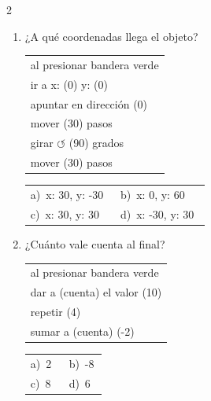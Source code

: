 \documentclass[11pt,a4paper]{article}
\begin{document}
\begin{multicols}{2}
\begin{enumerate}[label=\textbf{\arabic*.},leftmargin=*,itemsep=10pt,topsep=0pt]
\item \begin{minipage}[t]{\linewidth}
¿A qué coordenadas llega el objeto?
\par\vspace{3pt}\hspace*{1em}\begin{tabular}{@{}l@{}}\ttfamily\small al presionar bandera verde \\
\ttfamily\small ir a x: (0) y: (0) \\
\ttfamily\small apuntar en dirección (0) \\
\ttfamily\small mover (30) pasos \\
\ttfamily\small girar $\circlearrowleft$ (90) grados \\
\ttfamily\small mover (30) pasos
\end{tabular}\par

\vspace{4pt}
\begin{tabular}{@{}>{\raggedright\arraybackslash}p{0.47\linewidth}>{\raggedright\arraybackslash}p{0.47\linewidth}@{}}
a)~x: 30, y: -30 & b)~x: 0, y: 60 \\
c)~x: 30, y: 30 & d)~x: -30, y: 30 \\
\end{tabular}
\end{minipage}

\item \begin{minipage}[t]{\linewidth}
¿Cuánto vale cuenta al final?
\par\vspace{3pt}\hspace*{1em}\begin{tabular}{@{}l@{}}\ttfamily\small al presionar bandera verde \\
\ttfamily\small dar a (cuenta) el valor (10) \\
\ttfamily\small repetir (4) \\
\ttfamily\small \hspace*{1.5em}sumar a (cuenta) (-2)
\end{tabular}\par

\vspace{4pt}
\begin{tabular}{@{}>{\raggedright\arraybackslash}p{0.47\linewidth}>{\raggedright\arraybackslash}p{0.47\linewidth}@{}}
a)~2 & b)~-8 \\
c)~8 & d)~6 \\
\end{tabular}
\end{minipage}


\end{enumerate}
\end{multicols}
\end{document}
